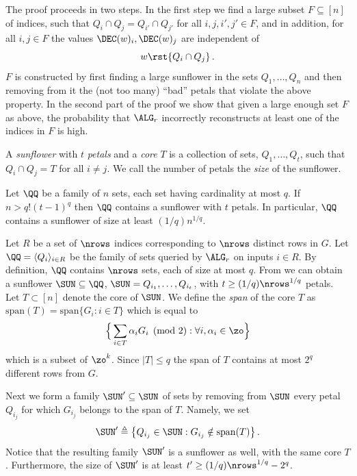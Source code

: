 The proof proceeds in two steps. In the first step we find a large
subset $F \subseteq [n]$ of indices, such that $Q_i \cap Q_j = Q_{i'}
\cap Q_{j'}$ for all $i,j,i',j' \in F$, and in addition, for all $i,j
\in F$ the values $\DEC(w)_i, \DEC(w)_j$ are independent of
\[
w\rst{Q_i \cap Q_j}\,.
\]
$F$ is constructed by first finding a large sunflower in the sets $Q_1,\ldots,Q_n$ and then removing from it the (not too many) ``bad'' petals that violate the above property. In the second part of the proof we show that given a large enough set $F$ as above, the probability that $\ALG_r$ incorrectly reconstructs at least one of the indices in $F$ is high.

\begin{definition}
A \emph{sunflower} with $t$ \emph{petals} and a \emph{core} $T$ is a collection of sets,
%
$Q_1,\ldots,Q_t$, such that $Q_i \cap Q_j = T$ for all $i \ne j$.
%
%
We call the number of petals the \emph{size} of the sunflower.
\end{definition}

\begin{lemma}\label{lem:sunfl}
Let $\QQ$ be a family of $n$ sets, each set having cardinality at most $q$. If
$n > q!(t - 1)^q$ then $\QQ$ contains a sunflower with $t$ petals. In particular, $\QQ$ contains a sunflower of size at least $({1}/{q}) n^{1/q}$.
\end{lemma}

Let $R$ be a set of $\nrows$ indices corresponding to $\nrows$ distinct rows in $G$. Let $\QQ = \langle Q_i \rangle_{i \in R}$ be the family of sets queried by $\ALG_r$ on inputs $i \in R$. By definition, $\QQ$ contains $\nrows$ sets, each of size at most $q$. {}From  we can obtain a sunflower $\SUN \subseteq \QQ$, $\SUN = Q_{i_1},\ldots,Q_{i_t}$, with $t \geq ({1}/{q}) \nrows^{1/q}$ petals. Let $T \subset [n]$ denote the core of $\SUN$.
We define the \emph{span} of the core $T$ as
$\mbox{span}(T) = \mbox{span}\{G_i : i\in T\}$ which is equal to  $$\Big\{ \sum_{i\in T} \alpha_i G_i \pmod{2}: \forall i, \alpha_i \in \zo \Big\}$$
which is a subset of $\zo^k$.
Since $|T| \leq q$ the span of $T$ contains at most $2^q$ different rows from $G$.

Next we form a family $\SUN' \subseteq \SUN$ of sets by removing from $\SUN$ every petal $Q_{i_j}$ for which $G_{i_j}$ belongs to the span of $T$.
Namely, we set
\[
\SUN' \triangleq \bigl\{Q_{i_j} \in \SUN : G_{i_j} \notin \mbox{span}(T)
\bigr\}\,.
\]
Notice that the
resulting family $\SUN'$ is a sunflower as well, with the same core $T$. Furthermore, the size of $\SUN'$ is
at least $t' \geq ({1}/{q}) \nrows^{1/q} - 2^q$.

